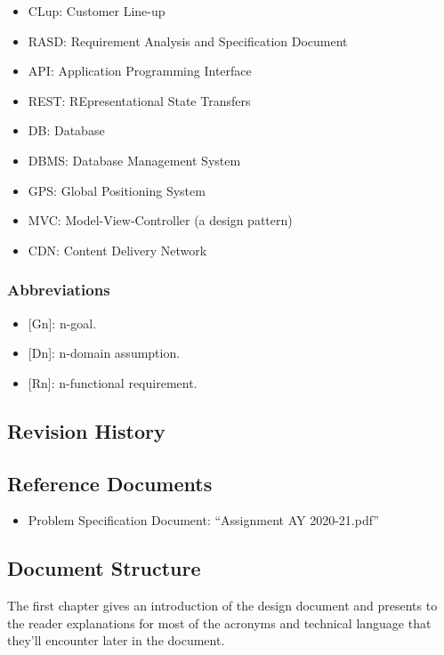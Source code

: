 \begin{itemize}
    \item CLup: Customer Line-up
    \item RASD: Requirement Analysis and Specification Document
    \item API: Application Programming Interface
    \item REST: REpresentational State Transfers
    \item DB: Database
    \item DBMS: Database Management System
    \item GPS: Global Positioning System
    \item MVC: Model-View-Controller (a design pattern)
    \item CDN: Content Delivery Network
\end{itemize}


\subsubsection{Abbreviations}

\begin{itemize}
    \item {[Gn]}: n-goal.
    \item {[Dn]}: n-domain assumption.
    \item {[Rn]}: n-functional requirement.
\end{itemize}

\subsection{Revision History}

\subsection{Reference Documents}

\begin{itemize}
    \item Problem Specification Document: ``Assignment AY 2020-21.pdf''
\end{itemize}

\subsection{Document Structure}

The first chapter gives an introduction of the design document and presents to the reader explanations for most of the acronyms and technical language that they'll encounter later in the document.

